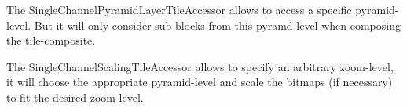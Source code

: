 The Single\+Channel\+Pyramid\+Layer\+Tile\+Accessor allows to access a specific pyramid-\/level. But it will only consider sub-\/blocks from this pyramd-\/level when composing the tile-\/composite.

The Single\+Channel\+Scaling\+Tile\+Accessor allows to specify an arbitrary zoom-\/level, it will choose the appropriate pyramid-\/level and scale the bitmaps (if necessary) to fit the desired zoom-\/level. 